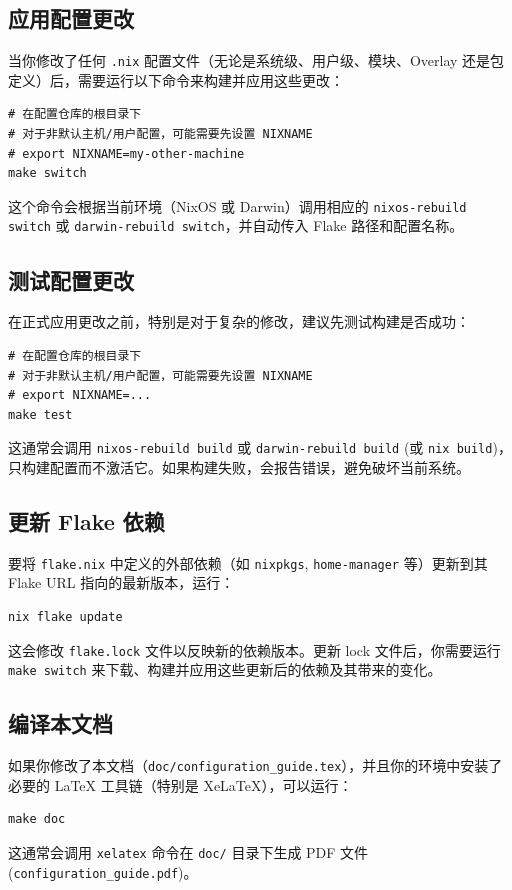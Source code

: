 \documentclass[11pt, a4paper]{article} %
\begin{document}
\subsection{应用配置更改}
当你修改了任何 \texttt{.nix} 配置文件（无论是系统级、用户级、模块、Overlay 还是包定义）后，需要运行以下命令来构建并应用这些更改：
\begin{lstlisting}
# 在配置仓库的根目录下
# 对于非默认主机/用户配置，可能需要先设置 NIXNAME
# export NIXNAME=my-other-machine
make switch
\end{lstlisting}
这个命令会根据当前环境（NixOS 或 Darwin）调用相应的 \texttt{nixos-rebuild switch} 或 \texttt{darwin-rebuild switch}，并自动传入 Flake 路径和配置名称。

\subsection{测试配置更改}
在正式应用更改之前，特别是对于复杂的修改，建议先测试构建是否成功：
\begin{lstlisting}
# 在配置仓库的根目录下
# 对于非默认主机/用户配置，可能需要先设置 NIXNAME
# export NIXNAME=...
make test
\end{lstlisting}
这通常会调用 \texttt{nixos-rebuild build} 或 \texttt{darwin-rebuild build} (或 \texttt{nix build})，只构建配置而不激活它。如果构建失败，会报告错误，避免破坏当前系统。

\subsection{更新 Flake 依赖}
要将 \texttt{flake.nix} 中定义的外部依赖（如 \texttt{nixpkgs}, \texttt{home-manager} 等）更新到其 Flake URL 指向的最新版本，运行：
\begin{lstlisting}
nix flake update
\end{lstlisting}
这会修改 \texttt{flake.lock} 文件以反映新的依赖版本。更新 lock 文件后，你需要运行 \texttt{make switch} 来下载、构建并应用这些更新后的依赖及其带来的变化。

\subsection{编译本文档}
如果你修改了本文档（\texttt{doc/configuration\_guide.tex}），并且你的环境中安装了必要的 LaTeX 工具链（特别是 XeLaTeX），可以运行：
\begin{lstlisting}
make doc
\end{lstlisting}
这通常会调用 \texttt{xelatex} 命令在 \texttt{doc/} 目录下生成 PDF 文件 (\texttt{configuration\_guide.pdf})。
\end{document}

